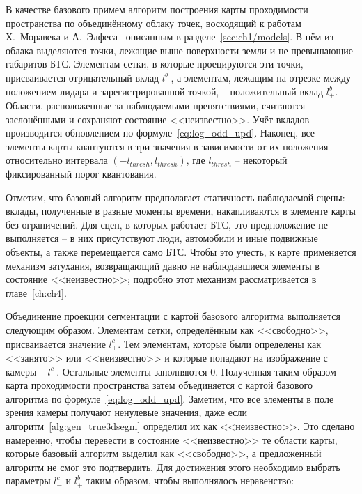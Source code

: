 В качестве базового примем алгоритм построения карты проходимости пространства по объединённому облаку точек, восходящий к работам Х.~Моравека и А.~Элфеса~\cite{moravec1985high, Moravec_1988} описанным в разделе~\cref{sec:ch1/models}. В нём из облака выделяются точки, лежащие выше поверхности земли и не превышающие габаритов БТС. Элементам сетки, в которые проецируются эти точки, присваивается отрицательный вклад $l^b_-$, а элементам, лежащим на отрезке между положением лидара и зарегистрированной точкой, -- положительный вклад $l^b_+$. Области, расположенные за наблюдаемыми препятствиями, считаются заслонёнными и сохраняют состояние <<неизвестно>>. Учёт вкладов производится обновлением по формуле~\cref{eq:log_odd_upd}. Наконец, все элементы карты квантуются в три значения в зависимости от их положения относительно интервала $(-l_{thresh}, l_{thresh})$, где $l_{thresh}$ -- некоторый фиксированный порог квантования.

Отметим, что базовый алгоритм предполагает статичность наблюдаемой сцены: вклады, полученные в разные моменты времени, накапливаются в элементе карты без ограничений. Для сцен, в которых работает БТС, это предположение не выполняется -- в них присутствуют люди, автомобили и иные подвижные объекты, а также перемещается само БТС. Чтобы это учесть, к карте применяется механизм затухания, возвращающий давно не наблюдавшиеся элементы в состояние <<неизвестно>>; подробно этот механизм рассматривается в главе~\cref{ch:ch4}.

Объединение проекции сегментации с картой базового алгоритма выполняется следующим образом. Элементам сетки, определённым как <<свободно>>, присваивается значение $l^c_+$. Тем элементам, которые были определены как <<занято>> или <<неизвестно>> и которые попадают на изображение с камеры -- $l^c_-$. Остальные элементы заполняются $0$. Полученная таким образом карта проходимости пространства затем объединяется с картой базового алгоритма по формуле~\cref{eq:log_odd_upd}. Заметим, что все элементы в поле зрения камеры получают ненулевые значения, даже если алгоритм~\ref{alg:gen_true3dsegm} определил их как <<неизвестно>>. Это сделано намеренно, чтобы перевести в состояние <<неизвестно>> те области карты, которые базовый алгоритм выделил как <<свободно>>, а предложенный алгоритм не смог это подтвердить. Для достижения этого необходимо выбрать параметры $l^c_-$ и $l^b_+$ таким образом, чтобы выполнялось неравенство:

